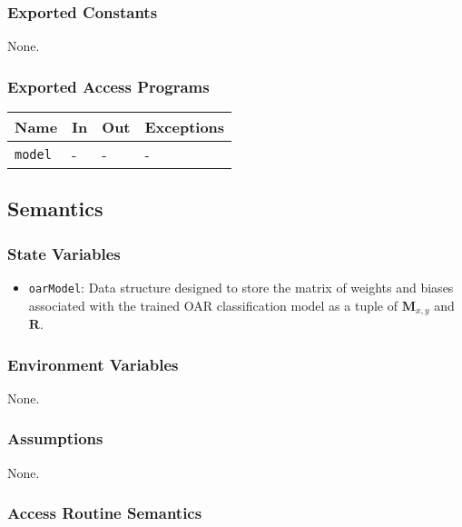 \documentclass[12pt, titlepage]{article}
\def\code#1{\texttt{#1}}
\begin{document}
\subsubsection{Exported Constants}

None.

\subsubsection{Exported Access Programs}

\begin{center}
\begin{tabular}{p{2cm} p{4cm} p{4cm} p{2cm}}
\hline
\textbf{Name} & \textbf{In} & \textbf{Out} & \textbf{Exceptions} \\
\hline
\code{model} & - & - & - \\
\hline
\end{tabular}
\end{center}

\subsection{Semantics}

\subsubsection{State Variables}

\begin{itemize}
  \item \code{oarModel}: Data structure designed to store the matrix of weights and biases associated
   with the trained OAR classification model as a tuple of $\mathbf{M}_{x,y}$ and $\mathbf{R}$.
\end{itemize}

\subsubsection{Environment Variables}

None.

\subsubsection{Assumptions}

None.

\subsubsection{Access Routine Semantics}
\end{document}
